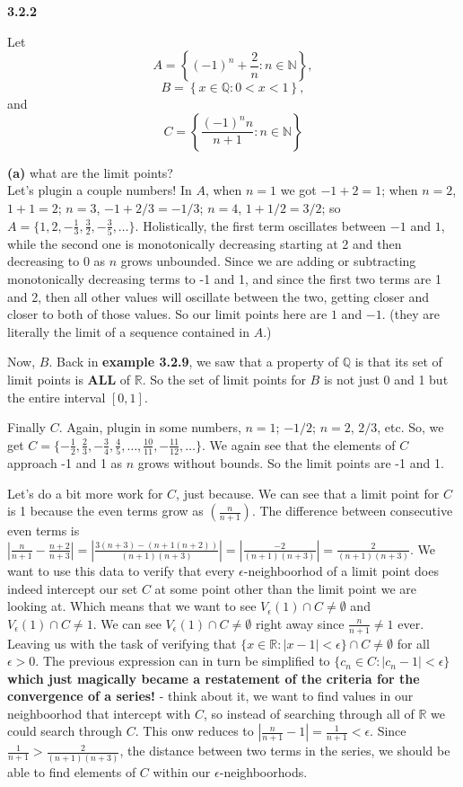 \textbf{3.2.2}

Let
$$
A = \left\{ (-1)^n + \frac{2}{n} : n\in\mathbb{N} \right\},
$$
$$
B = \left\{ x \in\mathbb{Q} : 0 < x < 1 \right\},
$$
and
$$
C = \left\{ \frac{(-1)^n n}{n+1} : n\in\mathbb{N} \right\}
$$

\textbf{(a)} what are the limit points?
\\

Let's plugin a couple numbers!
In $A$, when $n=1$ we got $-1 + 2 = 1$; when $n=2$, $1 + 1 = 2$; $n=3$, $-1 + 2/3 = -1/3$; $n=4$, $1 + 1/2 = 3/2$;
so $A = \{ 1, 2, -\frac{1}{3}, \frac{3}{2}, -\frac{3}{5}, \ldots \}$.
Holistically, the first term oscillates between $-1$ and $1$, while the second one is monotonically decreasing
starting at 2 and then decreasing to 0 as $n$ grows unbounded.
Since we are adding or subtracting monotonically decreasing terms to -1 and 1, and since the first two terms are 1 and 2,
then all other values will oscillate between the two, getting closer and closer to both of those values.
So our limit points here are $1$ and $-1$. (they are literally the limit of a sequence contained in $A$.)

Now, $B$.
Back in \textbf{example 3.2.9}, we saw that a property of $\mathbb{Q}$ is that its set of limit points is \textbf{ALL}
of $\mathbb{R}$.
So the set of limit points for $B$ is not just 0 and 1 but the entire interval $[0,1]$.

Finally $C$. Again, plugin in some numbers, $n=1$; $-1/2$; $n=2$, $2/3$, etc.
So, we get $C = \{-\frac{1}{2}, \frac{2}{3}, -\frac{3}{4}, \frac{4}{5}, \ldots, \frac{10}{11}, -\frac{11}{12}, \ldots \}$.
We again see that the elements of $C$ approach -1 and 1 as $n$ grows without bounds.
So the limit points are -1 and 1.

Let's do a bit more work for $C$, just because.
We can see that a limit point for $C$ is 1 because the even terms grow as $(\frac{n}{n+1})$.
The difference between consecutive even terms is
$\left|\frac{n}{n+1} - \frac{n+2}{n+3}\right| = \left|\frac{3(n+3) - (n+1(n+2))}{(n+1)(n+3)}\right| = \left|\frac{-2}{(n+1)(n+3)}\right| = \frac{2}{(n+1)(n+3)}$.
We want to use this data to verify that every $\epsilon$-neighboorhod of a limit point does indeed intercept our set $C$
at some point other than the limit point we are looking at.
Which means that we want to see $V_{\epsilon} (1) \cap C \neq \emptyset$ and $V_{\epsilon} (1) \cap C \neq 1$.
We can see $V_{\epsilon} (1) \cap C \neq \emptyset$ right away since $\frac{n}{n+1} \neq 1$ ever.
Leaving us with the task of verifying that $\{ x\in\mathbb{R} : |x-1| < \epsilon \} \cap C \neq \emptyset$ for all $\epsilon > 0$.
The previous expression can in turn be simplified to $\{ c_n\in C : |c_n - 1| < \epsilon \}$
\textbf{which just magically became a restatement of the criteria for the convergence of a series!} -
think about it, we want to find values in our neighboorhod that intercept with $C$, so instead of searching through all of $\mathbb{R}$
we could search through $C$.
This onw reduces to $\left| \frac{n}{n+1} - 1 \right| = \frac{1}{n+1} < \epsilon$.
Since $ \frac{1}{n+1} > \frac{2}{(n+1)(n+3)}$, the distance between two terms in the series, we should be able to
find elements of $C$ within our $\epsilon$-neighboorhods.


